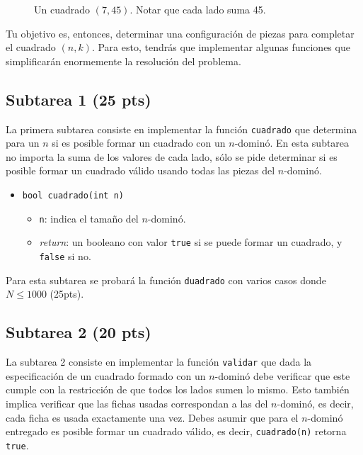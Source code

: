 \documentclass{oci}
\begin{document}
\begin{figure}[ht]
 \centering
 
 \caption{Un cuadrado $(7,45)$. Notar que cada lado suma 45.}
 \label{f:cuadrado7}
\end{figure}

Tu objetivo es, entonces, determinar una configuración de piezas para completar el cuadrado $(n,k)$.
Para esto, tendrás que implementar algunas funciones que simplificarán enormemente la resolución del problema.



\subsection*{Subtarea 1 (25 pts)}
La primera subtarea consiste en implementar la función \verb+cuadrado+ que determina para un $n$ si es posible formar un cuadrado con un $n$-dominó.
En esta subtarea no importa la suma de los valores de cada lado, sólo se pide determinar si es posible formar un cuadrado válido usando todas las piezas del $n$-dominó.

\begin{itemize}
 \item \verb+bool cuadrado(int n)+
 \begin{itemize}
  \item \verb+n+: indica el tamaño del $n$-dominó.
  \item \emph{return}: un booleano con valor \verb+true+ si se puede formar un cuadrado, y \verb+false+ si no.
 \end{itemize}
\end{itemize}

Para esta subtarea se probará la función \verb+duadrado+ con varios casos donde $N\leq 1000$ (25pts).

\subsection*{Subtarea 2 (20 pts)}
La subtarea 2 consiste en implementar la función \verb+validar+ que dada la especificación de un cuadrado formado con un $n$-dominó debe verificar que este cumple con la restricción de que todos los lados sumen lo mismo.
Esto también implica verificar que las fichas usadas correspondan a las del $n$-dominó, es decir, cada ficha es usada exactamente una vez.
Debes asumir que para el $n$-dominó entregado es posible formar un cuadrado válido, es decir, \verb+cuadrado(n)+ retorna \verb+true+.
\end{document}
